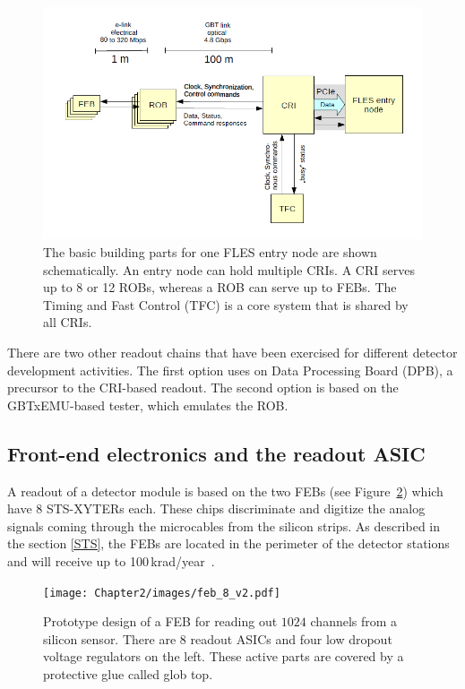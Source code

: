 \begin{figure}[!h]
\centering
\includegraphics[width=0.8\columnwidth]{Chapter2/images/CRI_DAQ.png}
\caption{The basic building parts for one \gls{FLES} entry node are shown schematically. An entry node can hold multiple \glspl{CRI}. A \gls{CRI} serves up to 8 or 12 \glspl{ROB}, whereas a \gls{ROB} can serve up to \glspl{FEB}. The Timing and Fast Control (\gls{TFC}) is a core system that is shared by all \glspl{CRI}.}
\label{fig_daq_schem}
\end{figure}

There are two other readout chains that have been exercised for different detector development activities. The first option uses on Data Processing Board (\gls{DPB}), a precursor to the CRI-based readout. The second option is based on the GBTxEMU-based tester, which emulates the \gls{ROB}.


\subsection{Front-end electronics and the readout ASIC}

A readout of a detector module is based on the two \glspl{FEB} (see Figure~\ref{fig_feb}) which have 8 STS-XYTERs each. These chips discriminate and digitize the analog signals coming through the microcables from the silicon strips. As described in the section \ref{STS}, the \glspl{FEB} are located in the perimeter of the detector stations and will receive up to 100\,krad/year~\cite{Heuser:54798}.

\begin{figure}[!h]
\centering
\texttt{[image: Chapter2/images/feb\_8\_v2.pdf]}
\caption{Prototype design of a \gls{FEB} for reading out $1024$ channels from a silicon sensor. There are 8 readout ASICs and four low dropout voltage regulators on the left. These active parts are covered by a protective glue called glob top.}
\label{fig_feb}
\end{figure}

